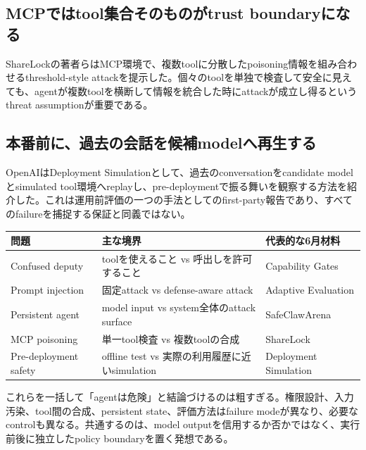 \subsection{MCPではtool集合そのものがtrust boundaryになる}

ShareLockの著者らはMCP環境で、複数toolに分散したpoisoning情報を組み合わせるthreshold-style attackを提示した。個々のtoolを単独で検査して安全に見えても、agentが複数toolを横断して情報を統合した時にattackが成立し得るというthreat assumptionが重要である。\autocite{src-91b06074799d}


\subsection{本番前に、過去の会話を候補modelへ再生する}

OpenAIはDeployment Simulationとして、過去のconversationをcandidate modelとsimulated tool環境へreplayし、pre-deploymentで振る舞いを観察する方法を紹介した。これは運用前評価の一つの手法としてのfirst-party報告であり、すべてのfailureを捕捉する保証と同義ではない。\autocite{src-c000018ba1f0}


\begin{center}
\small
\begin{tabularx}{\columnwidth}{>{\raggedright\arraybackslash}X|>{\raggedright\arraybackslash}X|>{\raggedright\arraybackslash}X}
\toprule
\textbf{問題} & \textbf{主な境界} & \textbf{代表的な6月材料} \\
\midrule
Confused deputy & toolを使えること vs 呼出しを許可すること & Capability Gates \\
Prompt injection & 固定attack vs defense-aware attack & Adaptive Evaluation \\
Persistent agent & model input vs system全体のattack surface & SafeClawArena \\
MCP poisoning & 単一tool検査 vs 複数toolの合成 & ShareLock \\
Pre-deployment safety & offline test vs 実際の利用履歴に近いsimulation & Deployment Simulation \\
\bottomrule
\end{tabularx}
\autocite{src-02da0db00c2d,src-6da0c5a88fa4,src-91b06074799d,src-c000018ba1f0,src-cd4b60edfee7}
\end{center}

これらを一括して「agentは危険」と結論づけるのは粗すぎる。権限設計、入力汚染、tool間の合成、persistent state、評価方法はfailure modeが異なり、必要なcontrolも異なる。共通するのは、model outputを信用するか否かではなく、実行前後に独立したpolicy boundaryを置く発想である。\autocite{src-02da0db00c2d,src-6da0c5a88fa4,src-91b06074799d,src-cd4b60edfee7}


